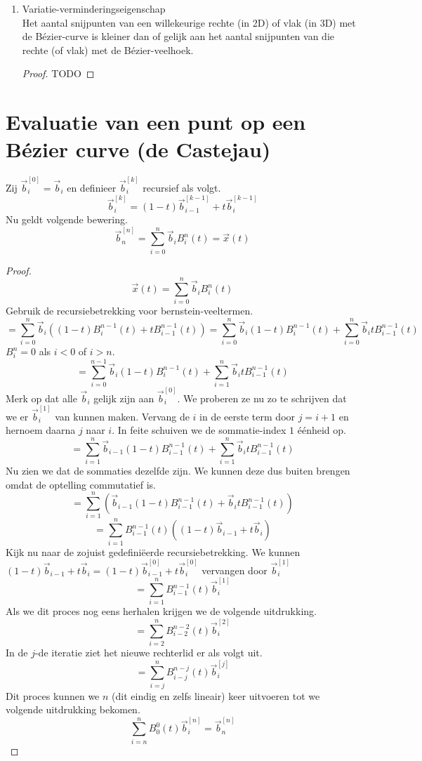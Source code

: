 \documentclass[tmi_notities.tex]{subfiles}
\begin{document}
\begin{enumerate}
\begin{proof}
\begin{itemize}
\item
\[
\vec{x}(1) = \sum_{i=0}^n\vec{b_{i}}B_{i}^{n}(1) = B_{n}^n\vec{b}_n = \vec{b}_n
\]
\end{itemize}
\end{proof}

\item Variatie-verminderingseigenschap\\
Het aantal snijpunten van een willekeurige rechte (in 2D) of vlak (in 3D) met de B\'ezier-curve is kleiner dan of gelijk aan het aantal snijpunten van die rechte (of vlak) met de B\'ezier-veelhoek.
\begin{proof}
TODO
\end{proof}

\end{enumerate}

\section{Evaluatie van een punt op een B\'ezier curve (de Castejau)}
Zij $\vec{b}_{i}^{[0]} = \vec{b}_{i}$ en definieer $\vec{b}_{i}^{[k]}$ recursief als volgt.
\[
\vec{b}_{i}^{[k]}
=
(1-t)\vec{b}_{i-1}^{[k-1]} + t\vec{b}_{i}^{[k-1]}
\]
Nu geldt volgende bewering. 
\[
\vec{b}_{n}^{[n]} = \sum_{i=0}^{n}\vec{b}_iB_{i}^{n}(t) = \vec{x}(t)
\]
\begin{proof}
\[
\vec{x}(t) = \sum_{i=0}^{n}\vec{b}_iB_{i}^{n}(t)
\]
Gebruik de recursiebetrekking voor bernstein-veeltermen.
\[
= \sum_{i=0}^{n}\vec{b}_i
\left( 
(1-t)B^{n-1}_{i}(t) + tB^{n-1}_{i-1}(t)
\right)
= 
\sum_{i=0}^{n}\vec{b}_i
(1-t)B^{n-1}_{i}(t) + 
\sum_{i=0}^{n}\vec{b}_it
B^{n-1}_{i-1}(t)
\]
$B_{i}^{n} = 0$ als $i < 0$ of $i > n$.
\[
= 
\sum_{i=0}^{n-1}\vec{b}_i
(1-t)B^{n-1}_{i}(t) + 
\sum_{i=1}^{n}\vec{b}_it
B^{n-1}_{i-1}(t)
\]
Merk op dat alle $\vec{b}_i$ gelijk zijn aan $\vec{b}_i^{[0]}$. We proberen ze nu zo te schrijven dat we er $\vec{b}_i^{[1]}$ van kunnen maken. Vervang de $i$ in de eerste term door $j=i+1$ en hernoem daarna $j$ naar $i$. In feite schuiven we de sommatie-index $1$ \'e\'enheid op.
\[
= 
\sum_{i=1}^{n}\vec{b}_{i-1}
(1-t)B^{n-1}_{i-1}(t) + 
\sum_{i=1}^{n}\vec{b}_it
B^{n-1}_{i-1}(t)
\]
Nu zien we dat de sommaties dezelfde zijn. We kunnen deze dus buiten brengen omdat de optelling commutatief is.
\[
= 
\sum_{i=1}^{n}
\left(
\vec{b}_{i-1}(1-t)B^{n-1}_{i-1}(t)
+ 
\vec{b}_itB^{n-1}_{i-1}(t)
\right)
\]
\[
= 
\sum_{i=1}^{n}
B^{n-1}_{i-1}(t)
\left(
(1-t)\vec{b}_{i-1}
+ 
t\vec{b}_i
\right)
\]
Kijk nu naar de zojuist gedefini\"eerde recursiebetrekking. We kunnen $(1-t)\vec{b}_{i-1} + t\vec{b}_i = (1-t)\vec{b}_{i-1}^{[0]} + t\vec{b}_i^{[0]}$ vervangen door $\vec{b}_{i}^{[1]}$
\[
= 
\sum_{i=1}^{n}
B^{n-1}_{i-1}(t)
\vec{b}_{i}^{[1]}
\]
Als we dit proces nog eens herhalen krijgen we de volgende uitdrukking.
\[
= 
\sum_{i=2}^{n}
B^{n-2}_{i-2}(t)
\vec{b}_{i}^{[2]}
\]
In de $j$-de iteratie ziet het nieuwe rechterlid er als volgt uit.
\[
= 
\sum_{i=j}^{n}
B^{n-j}_{i-j}(t)
\vec{b}_{i}^{[j]}
\]
Dit proces kunnen we $n$ (dit eindig en zelfs lineair) keer uitvoeren tot we volgende uitdrukking bekomen.
\[
\sum_{i=n}^{n}
B^{0}_{0}(t)
\vec{b}_{i}^{[n]}
= \vec{b}_{n}^{[n]}
\]
\end{proof}
\end{document}
